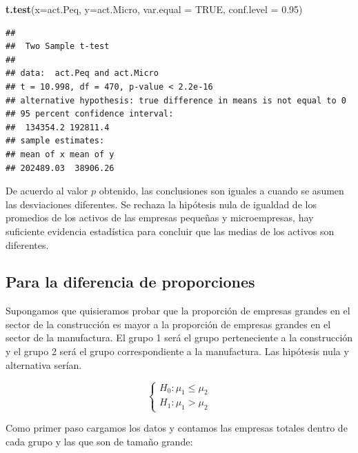 \documentclass[letterpaper,]{book}
\newenvironment{Shaded}{\begin{snugshade}}{\end{snugshade}}
\newcommand{\DataTypeTok}[1]{\textcolor[rgb]{0.13,0.29,0.53}{#1}}
\newcommand{\FloatTok}[1]{\textcolor[rgb]{0.00,0.00,0.81}{#1}}
\newcommand{\KeywordTok}[1]{\textcolor[rgb]{0.13,0.29,0.53}{\textbf{#1}}}
\newcommand{\NormalTok}[1]{#1}
\newcommand{\OtherTok}[1]{\textcolor[rgb]{0.56,0.35,0.01}{#1}}
\begin{document}
\begin{Shaded}
\begin{Highlighting}[]
\KeywordTok{t.test}\NormalTok{(}\DataTypeTok{x=}\NormalTok{act.Peq, }\DataTypeTok{y=}\NormalTok{act.Micro, }\DataTypeTok{var.equal =} \OtherTok{TRUE}\NormalTok{,}
       \DataTypeTok{conf.level =} \FloatTok{0.95}\NormalTok{)}
\end{Highlighting}
\end{Shaded}

\begin{verbatim}
## 
##  Two Sample t-test
## 
## data:  act.Peq and act.Micro
## t = 10.998, df = 470, p-value < 2.2e-16
## alternative hypothesis: true difference in means is not equal to 0
## 95 percent confidence interval:
##  134354.2 192811.4
## sample estimates:
## mean of x mean of y 
## 202489.03  38906.26
\end{verbatim}

De acuerdo al valor \(p\) obtenido, las conclusiones son iguales a cuando se asumen las desviaciones diferentes. Se rechaza la hipótesis nula de igualdad de los promedios de los activos de las empresas pequeñas y microempresas, hay suficiente evidencia estadística para concluir que las medias de los activos son diferentes.

\hypertarget{para-la-diferencia-de-proporciones}{%
\subsection{Para la diferencia de proporciones}\label{para-la-diferencia-de-proporciones}}

Supongamos que quisieramos probar que la proporción de empresas grandes en el sector de la construcción es mayor a la proporción de empresas grandes en el sector de la manufactura. El grupo 1 será el grupo perteneciente a la construcción y el grupo 2 será el grupo correspondiente a la manufactura. Las hipótesis nula y alternativa serían.

\begin{equation} 
\begin{cases} 
H_0: \mu_1 \leq \mu_2 \\ 
H_1: \mu_1 > \mu_2
\end{cases} 
\end{equation}

Como primer paso cargamos los datos y contamos las empresas totales dentro de cada grupo y las que son de tamaño grande:
\end{document}

